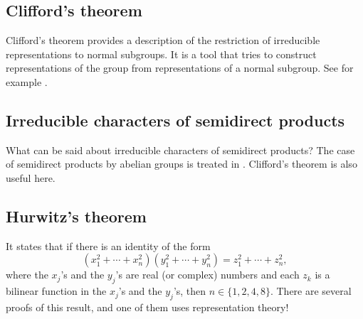 \subsection*{Clifford's theorem}

Clifford’s theorem provides a description of the restriction of  irreducible representations to normal subgroups. It is a tool
that tries to construct representations of the group
from representations of a normal subgroup. See for example
\cite[Chapter~7]{MR3970262}. 

\subsection*{Irreducible characters of semidirect products}

What can be said about irreducible characters
of semidirect products? The case of 
semidirect products by abelian groups is treated 
in \cite[Section 8.2]{MR0450380}. Clifford's theorem is also useful 
here. 

\subsection*{Hurwitz's theorem}

It states that 
if there is an identity of the form 
	\begin{equation*}
		(x_1^2+\cdots+x_n^2)(y_1^2+\cdots+y_n^2)=z_1^2+\cdots+z_n^2,
	\end{equation*}
	where the $x_j$'s and the $y_j$'s are real (or complex) numbers and
	each $z_k$ is a bilinear function in the $x_j$'s and the $y_j$'s, then 
	$n\in\{1,2,4,8\}$. There are several 
    proofs of this result, and one of them uses representation theory! 




